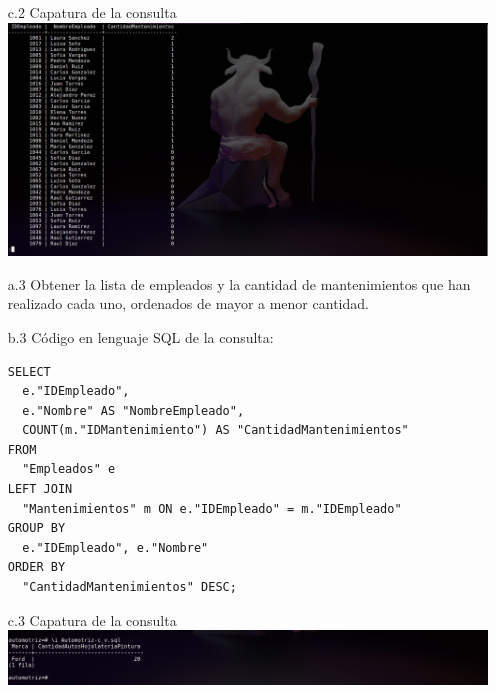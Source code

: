 \documentclass[12pt]{article}
\begin{document}
\begin{itemize}
    \item[c.2] Capatura de la consulta
    \includegraphics[width=1.0\textwidth]{L.png}
    \item[a.3] Obtener la lista de empleados y la cantidad de mantenimientos que han realizado cada uno, ordenados de mayor a menor cantidad.
    \item[b.3] Código en lenguaje SQL de la consulta:
    \begin{lstlisting}
SELECT
  e."IDEmpleado",
  e."Nombre" AS "NombreEmpleado",
  COUNT(m."IDMantenimiento") AS "CantidadMantenimientos"
FROM
  "Empleados" e
LEFT JOIN
  "Mantenimientos" m ON e."IDEmpleado" = m."IDEmpleado"
GROUP BY
  e."IDEmpleado", e."Nombre"
ORDER BY
  "CantidadMantenimientos" DESC;
    \end{lstlisting}
    \item[c.3] Capatura de la consulta
    \includegraphics[width=1.0\textwidth]{M.png}
    \end{itemize}
    
\end{document}
